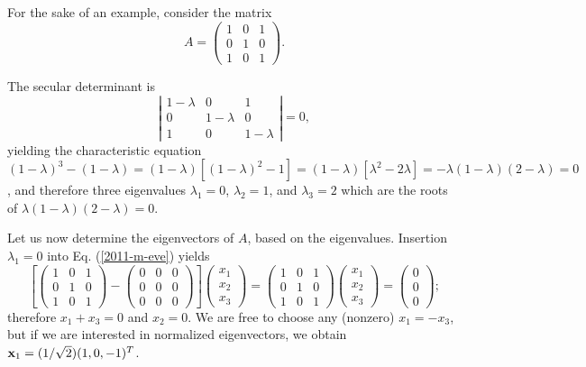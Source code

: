 {\color{blue}
\bexample
For the sake of an example, consider  the
{matrix}
\begin{equation}
A=
\begin{pmatrix}
1&0&1\\
0&1&0\\
1&0&1
\end{pmatrix}.
\end{equation}

The secular determinant is
$$
\left|
\begin{matrix}
1-\lambda &0&1\\
0&1-\lambda &0\\
1&0&1-\lambda
\end{matrix}
\right| = 0,
$$
yielding the characteristic equation
$
(1-\lambda )^3 -(1-\lambda ) =(1-\lambda )[(1-\lambda )^2 - 1]=(1-\lambda )[\lambda ^2 - 2\lambda ]= - \lambda (1-\lambda )(2-\lambda ) =0$,
and therefore three  eigenvalues
$\lambda_1=0$,
$\lambda_2=1$, and
$\lambda_3=2$ which are the roots of $\lambda (1-\lambda )(2-\lambda ) =0$.

Let us now determine the eigenvectors of $A$, based on the eigenvalues.
Insertion  $\lambda_1=0$ into Eq. (\ref{2011-m-eve}) yields
\begin{equation}
\left[
\begin{pmatrix}
1&0&1\\
0&1&0\\
1&0&1
\end{pmatrix}  -
\begin{pmatrix}
0&0&0\\
0&0&0\\
0&0&0
\end{pmatrix}
\right]
\begin{pmatrix}
x_1\\
x_2\\
x_3
\end{pmatrix}
=
\begin{pmatrix}
1&0&1\\
0&1&0\\
1&0&1
\end{pmatrix}
\begin{pmatrix}
x_1\\
x_2\\
x_3
\end{pmatrix}
=
\begin{pmatrix}
0\\
0\\
0
\end{pmatrix}
;
\end{equation}
therefore $x_1+x_3=0$ and $x_2=0$.
We are free to choose any (nonzero) $x_1=-x_3$,
but if we are interested in normalized eigenvectors, we obtain
${\bf x}_1 =(1/\sqrt{2})(1,0,-1)^T$.

}
